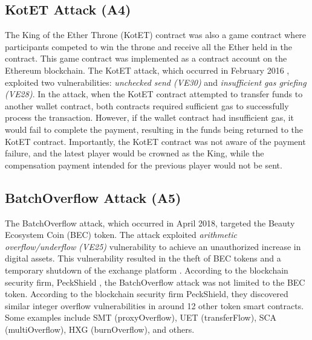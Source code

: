 \documentclass[manuscript,screen]{acmart}
\begin{document}
\subsection{KotET Attack (A4)}
The King of the Ether Throne (KotET) contract was also a game contract where participants competed to win the throne and receive all the Ether held in the contract. This game contract was implemented as a contract account on the Ethereum blockchain.
The KotET attack, which occurred in February 2016 \cite{KotET}, exploited two vulnerabilities: \textit{unchecked send (VE30)} and \textit{insufficient gas griefing (VE28)}. In the attack, when the KotET contract attempted to transfer funds to another wallet contract, both contracts required sufficient gas to successfully process the transaction. However, if the wallet contract had insufficient gas, it would fail to complete the payment, resulting in the funds being returned to the KotET contract. Importantly, the KotET contract was not aware of the payment failure, and the latest player would be crowned as the King, while the compensation payment intended for the previous player would not be sent.


\subsection{BatchOverflow Attack (A5)}
The BatchOverflow attack, which occurred in April 2018, targeted the Beauty Ecosystem Coin (BEC) token. The attack exploited \textit{arithmetic overflow/underflow (VE25)} vulnerability to achieve an unauthorized increase in digital assets. This vulnerability resulted in the theft of BEC tokens and a temporary shutdown of the exchange platform \cite{BECevent}. According to the blockchain security firm, PeckShield \cite{peckshield}, the BatchOverflow attack was not limited to the BEC token. According to the blockchain security firm PeckShield, they discovered similar integer overflow vulnerabilities in around 12 other token smart contracts. Some examples include SMT (proxyOverflow), UET (transferFlow), SCA (multiOverflow), HXG (burnOverflow), and others.
\end{document}
